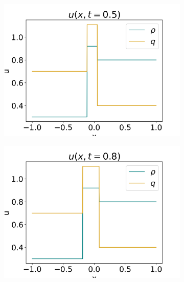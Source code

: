 \documentclass[10pt]{article}
\numberwithin{equation}{section}
\begin{document}
\begin{figure}
\begin{subfigure}[t]{0.2\textwidth}
         \includegraphics[width=\textwidth]{Figures/Model/Plots/SysShockAtTime5.png}
     \end{subfigure}
     \begin{subfigure}[t]{0.2\textwidth}
         \centering
         \includegraphics[width=\textwidth]{Figures/Model/Plots/SysShockAtTime8.png}
     \end{subfigure}
     \\
     \begin{subfigure}[b]{0.35\textwidth}
         \centering

\end{subfigure}
\end{figure}
\end{document}
